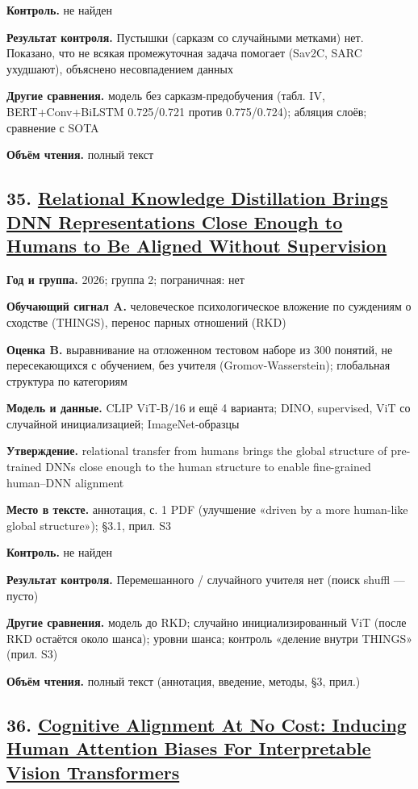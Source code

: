 \textbf{Контроль.} не найден

\textbf{Результат контроля.} Пустышки (сарказм со случайными метками) нет. Показано, что не всякая промежуточная задача помогает (Sav2C, SARC ухудшают), объяснено несовпадением данных

\textbf{Другие сравнения.} модель без сарказм-предобучения (табл. IV, BERT+Conv+BiLSTM 0.725/0.721 против 0.775/0.724); абляция слоёв; сравнение с SOTA

\textbf{Объём чтения.} полный текст


\subsection*{35. \href{https://doi.org/10.48550/arxiv.2608.27877}{Relational Knowledge Distillation Brings DNN Representations Close Enough to Humans to Be Aligned Without Supervision}}

\textbf{Год и группа.} 2026; группа 2; пограничная: нет

\textbf{Обучающий сигнал A.} человеческое психологическое вложение по суждениям о сходстве (THINGS), перенос парных отношений (RKD)

\textbf{Оценка B.} выравнивание на отложенном тестовом наборе из 300 понятий, не пересекающихся с обучением, без учителя (Gromov-Wasserstein); глобальная структура по категориям

\textbf{Модель и данные.} CLIP ViT-B/16 и ещё 4 варианта; DINO, supervised, ViT со случайной инициализацией; ImageNet-образцы

\textbf{Утверждение.} relational transfer from humans brings the global structure of pre-trained DNNs close enough to the human structure to enable fine-grained human–DNN alignment

\textbf{Место в тексте.} аннотация, с. 1 PDF (улучшение «driven by a more human-like global structure»); §3.1, прил. S3

\textbf{Контроль.} не найден

\textbf{Результат контроля.} Перемешанного / случайного учителя нет (поиск shuffl — пусто)

\textbf{Другие сравнения.} модель до RKD; случайно инициализированный ViT (после RKD остаётся около шанса); уровни шанса; контроль «деление внутри THINGS» (прил. S3)

\textbf{Объём чтения.} полный текст (аннотация, введение, методы, §3, прил.)


\subsection*{36. \href{https://doi.org/10.48550/arxiv.2604.20027}{Cognitive Alignment At No Cost: Inducing Human Attention Biases For Interpretable Vision Transformers}}

